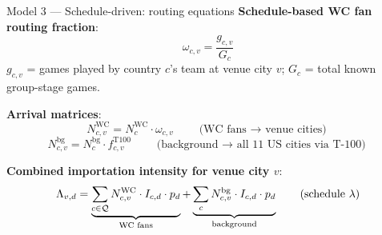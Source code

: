 \documentclass[aspectratio=169, 11pt]{beamer}
\begin{document}
\begin{frame}{Model 3 — Schedule-driven: routing equations}
  \textbf{Schedule-based WC fan routing fraction}:
  \begin{equation}
    \omega_{c,v} = \frac{g_{c,v}}{G_c}
    \tag{schedule routing}
  \end{equation}
  $g_{c,v}$ = games played by country $c$'s team at venue city $v$;
  $G_c$ = total known group-stage games.

  \medskip
  \textbf{Arrival matrices}:
  \[
    N_{c,v}^{\text{WC}} = N_c^{\text{WC}} \cdot \omega_{c,v}
    \qquad\text{(WC fans $\to$ venue cities)}
  \]
  \[
    N_{c,v}^{\text{bg}} = N_c^{\text{bg}} \cdot f_{c,v}^{\text{T100}}
    \qquad\text{(background $\to$ all 11 US cities via T-100)}
  \]

  \textbf{Combined importation intensity for venue city $v$}:
  \begin{equation}
    \Lambda_{v,d} =
      \underbrace{%
        \sum_{c \in \mathcal{Q}} N_{c,v}^{\text{WC}} \cdot I_{c,d} \cdot p_d
      }_{\text{WC fans}}
      +
      \underbrace{%
        \sum_{c} N_{c,v}^{\text{bg}} \cdot I_{c,d} \cdot p_d
      }_{\text{background}}
    \tag{schedule $\lambda$}
  \end{equation}
\end{frame}
\end{document}

